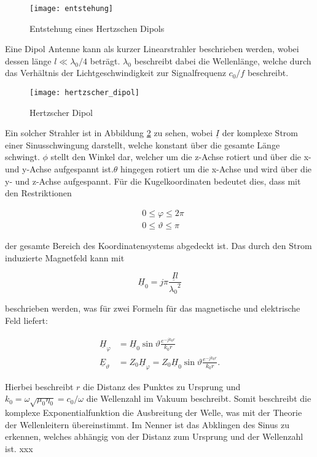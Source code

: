 \begin{figure}[H]
	\centering
	\texttt{[image: entstehung]}
	\caption{Entstehung eines Hertzschen Dipols}\label{fig:entstehung}
\end{figure}

Eine Dipol Antenne kann als kurzer Linearstrahler beschrieben werden, wobei dessen länge $l \ll \lambda_0 /4$ beträgt. $\lambda_0$ beschreibt dabei die Wellenlänge, welche durch das Verhältnis der Lichtgeschwindigkeit zur Signalfrequenz $c_0/f$ beschreibt. 

\begin{figure}[H]
	\centering
	\texttt{[image: hertzscher\_dipol]}
	\caption{Hertzscher Dipol}\label{fig:hertzsche Dipol}
\end{figure}

Ein solcher Strahler ist in Abbildung \ref{fig:hertzsche Dipol} zu sehen, wobei $\underline{I}$ der komplexe Strom einer Sinusschwingung darstellt, welche konstant über die gesamte Länge schwingt. $\phi$ stellt den Winkel dar, welcher um die z-Achse rotiert und über die x- und y-Achse aufgespannt ist.$\theta$ hingegen rotiert um die x-Achse und wird über die y- und z-Achse aufgespannt. Für die Kugelkoordinaten bedeutet dies, dass mit den Restriktionen 

\begin{align}
&0 \leq \varphi \leq 2\pi\\
&0 \leq \vartheta \leq \pi \label{eq:HertzTheta}
\end{align}

der gesamte Bereich des Koordinatensystems abgedeckt ist. Das durch den Strom induzierte Magnetfeld kann mit 

\begin{equation}
\underline{H}_0 = j\pi \frac{\underline{I}l}{{\lambda_0}^2}
\end{equation}

beschrieben werden, was für zwei Formeln für das magnetische und elektrische Feld liefert:

\begin{align}
\underline{H}_\varphi   &= \underline{H}_0 \sin \vartheta \frac{e^{-jk_0r}}{k_0r}\\
\underline{E}_\vartheta &= Z_0 \underline{H}_\varphi = Z_0 \underline{H}_0 \sin \vartheta \frac{e^{-jk_0r}}{k_0r}.\label{eq:HertzE}
\end{align}

Hierbei beschreibt $r$ die Distanz des Punktes zu Ursprung und $k_0 = \omega \sqrt{\mu_0 \eta_0} = c_0/\omega$ die Wellenzahl im Vakuum beschreibt. Somit beschreibt die komplexe Exponentialfunktion die Ausbreitung der Welle, was mit der Theorie der Wellenleitern übereinstimmt. Im Nenner ist das Abklingen des Sinus zu erkennen, welches abhängig von der Distanz zum Ursprung und der Wellenzahl ist. xxx

